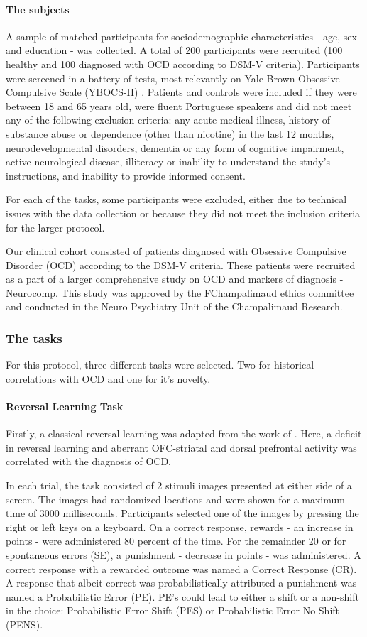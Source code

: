 \documentclass[11pt]{article}
\begin{document}
\paragraph{The subjects}
A sample of matched participants for sociodemographic characteristics - age, sex and education -  was collected. A total of 200 participants were recruited (100 healthy and 100 diagnosed with OCD according to DSM-V criteria). Participants were screened in a battery of tests, most relevantly on Yale-Brown Obsessive Compulsive Scale (YBOCS-II) \cite{goodman1991yale}. Patients and controls were included if they were between 18 and 65 years old, were fluent Portuguese speakers and did not meet any of the following exclusion criteria: any acute medical illness, history of substance abuse or dependence (other than nicotine) in the last 12 months, neurodevelopmental disorders, dementia or any form of cognitive impairment, active neurological disease, illiteracy or inability to understand the study’s instructions, and inability to provide informed consent.

For each of the tasks, some participants were excluded, either due to technical issues with the data collection or because they did not meet the inclusion criteria for the larger protocol.

Our clinical cohort consisted of patients diagnosed with Obsessive Compulsive Disorder (OCD) according to the DSM-V criteria. These patients were recruited as a part of a larger comprehensive study on OCD and markers of diagnosis - Neurocomp. This study was approved by the FChampalimaud ethics committee and conducted in the Neuro Psychiatry Unit of the Champalimaud Research.

\subsubsection{The tasks}
For this protocol, three different tasks were selected. Two for historical correlations with OCD and one for it's novelty.
\paragraph{Reversal Learning Task}
Firstly, a classical reversal learning was adapted from the work of \cite{remijnse2006reduced}. Here, a deficit in reversal learning and aberrant OFC-striatal and dorsal prefrontal activity was correlated with the diagnosis of OCD.

In each trial, the task consisted of 2 stimuli images presented at either side of a screen. The images had randomized locations and were shown for a maximum time of 3000 milliseconds. Participants selected one of the images by pressing the right or left keys on a keyboard. On a correct response, rewards - an increase in points - were administered 80 percent of the time. For the remainder 20 or for spontaneous errors (SE), a punishment - decrease in points - was administered. A correct response with a rewarded outcome was named a Correct Response (CR). A response that albeit correct was probabilistically attributed a punishment was named a Probabilistic Error (PE). PE's could lead to either a shift or a non-shift in the choice: Probabilistic Error Shift (PES) or Probabilistic Error No Shift (PENS).
\end{document}
